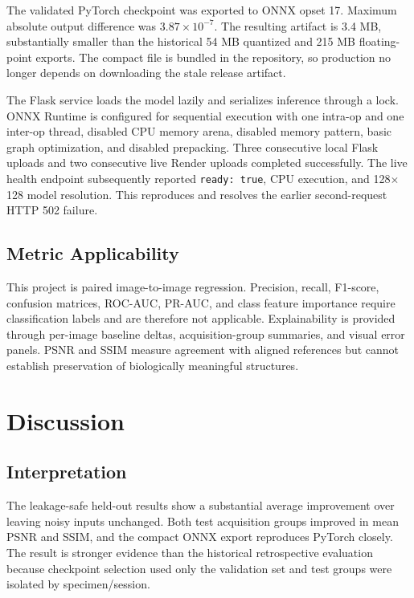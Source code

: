 \documentclass[12pt,a4paper]{report}
\begin{document}
The validated PyTorch checkpoint was exported to ONNX opset 17. Maximum absolute output difference was $3.87\times10^{-7}$. The resulting artifact is 3.4 MB, substantially smaller than the historical 54 MB quantized and 215 MB floating-point exports. The compact file is bundled in the repository, so production no longer depends on downloading the stale release artifact.

The Flask service loads the model lazily and serializes inference through a lock. ONNX Runtime is configured for sequential execution with one intra-op and one inter-op thread, disabled CPU memory arena, disabled memory pattern, basic graph optimization, and disabled prepacking. Three consecutive local Flask uploads and two consecutive live Render uploads completed successfully. The live health endpoint subsequently reported \texttt{ready: true}, CPU execution, and 128$\times$128 model resolution. This reproduces and resolves the earlier second-request HTTP 502 failure.

\section{Metric Applicability}

This project is paired image-to-image regression. Precision, recall, F1-score, confusion matrices, ROC-AUC, PR-AUC, and class feature importance require classification labels and are therefore not applicable. Explainability is provided through per-image baseline deltas, acquisition-group summaries, and visual error panels. PSNR and SSIM measure agreement with aligned references but cannot establish preservation of biologically meaningful structures.

\chapter{Discussion}
\label{chap:validated_discussion}

\section{Interpretation}

The leakage-safe held-out results show a substantial average improvement over leaving noisy inputs unchanged. Both test acquisition groups improved in mean PSNR and SSIM, and the compact ONNX export reproduces PyTorch closely. The result is stronger evidence than the historical retrospective evaluation because checkpoint selection used only the validation set and test groups were isolated by specimen/session.
\end{document}
